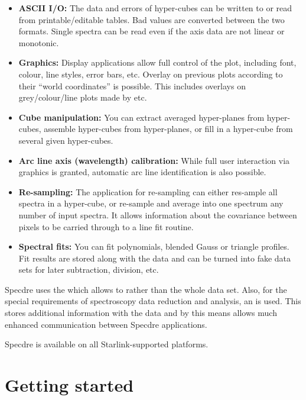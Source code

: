 \begin{itemize}
\item {\bf ASCII I/O:} The data and errors of hyper-cubes can be written
   to or read from printable/editable tables. Bad values are converted
   between the two formats. Single spectra can be read even if the axis
   data are not linear or monotonic.
\item {\bf Graphics:} Display applications allow full control of
   the plot, including font, colour, line styles, error bars, etc.
   Overlay on previous plots according to their ``world coordinates'' is
   possible. This includes overlays on grey/colour/line plots made by
   etc.
\item {\bf Cube manipulation:} You can extract averaged hyper-planes
   from hyper-cubes, assemble hyper-cubes from hyper-planes, or fill in
   a hyper-cube from several given hyper-cubes.
\item {\bf Arc line axis (wavelength) calibration:} While full user
   interaction via graphics is granted, automatic arc line
   identification is also possible.
\item {\bf Re-sampling:} The application for re-sampling can either
   res-ample all spectra in a hyper-cube, or re-sample and average into
   one spectrum any number of input spectra. It allows information about
   the covariance between pixels to be carried through to a line fit
   routine.
\item {\bf Spectral fits:} You can fit polynomials, blended Gauss or
   triangle profiles. Fit results are stored along with the data and can
   be turned into fake data sets for later subtraction, division, etc.
\end{itemize}

   Specdre uses the
   which allows to
   rather than the whole data set. Also, for the special requirements of
   spectroscopy data reduction and analysis, an
   is used. This stores additional information with the data and by this
   means allows much enhanced communication between Specdre applications.

   Specdre is available on all Starlink-supported platforms.


\section{\label{getstart}Getting started}

